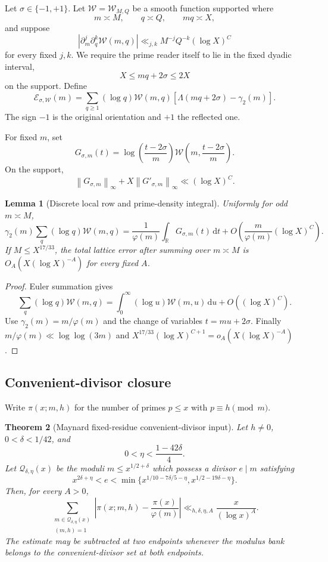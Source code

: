 \documentclass[11pt]{article}
\newtheorem{theorem}{Theorem}[section]
\newtheorem{lemma}[theorem]{Lemma}
\theoremstyle{definition}
\theoremstyle{remark}
\newcommand{\R}{\mathbb R}
\newcommand{\dd}{\mathrm d}
\newcommand{\norm}[1]{\left\lVert#1\right\rVert}
\begin{document}
Let $\sigma\in\{-1,+1\}$.  Let
$\mathscr W=\mathscr W_{M,Q}$ be a smooth function supported where
\[
 m\asymp M,
 \qquad q\asymp Q,
 \qquad mq\asymp X,
\]
and suppose
\[
 |\partial_m^j\partial_q^k\mathscr W(m,q)|
 \ll_{j,k}M^{-j}Q^{-k}(\log X)^C
 \tag{M.9}
\]
for every fixed $j,k$.  We require the prime reader itself to lie in the
fixed dyadic interval,
\[
 X\le mq+2\sigma\le2X
\]
on the support.  Define
\[
 \boxed{
 \mathcal E_{\sigma,\mathscr W}(m)
 =\sum_{q\ge1}(\log q)\mathscr W(m,q)
  [\Lambda(mq+2\sigma)-\gamma_2(m)].}
 \tag{M.10}
\]
The sign $-1$ is the original orientation and $+1$ the reflected one.

For fixed $m$, set
\[
 G_{\sigma,m}(t)
 =\log\!\left(\frac{t-2\sigma}{m}\right)
  \mathscr W\!\left(m,\frac{t-2\sigma}{m}\right).
 \tag{M.11}
\]
On the support,
\[
 \norm{G_{\sigma,m}}_\infty
 +X\norm{G'_{\sigma,m}}_\infty
 \ll(\log X)^C.
 \tag{M.12}
\]

\begin{lemma}[Discrete local row and prime-density integral]
\label{lem:hard-local-integral}
Uniformly for odd $m\asymp M$,
\[
 \boxed{
 \gamma_2(m)\sum_q(\log q)\mathscr W(m,q)
 =\frac1{\varphi(m)}\int_\R G_{\sigma,m}(t)\,\dd t
 +O\!\left(\frac{m}{\varphi(m)}(\log X)^C\right).}
 \tag{M.13}
\]
If $M\le X^{17/33}$, the total lattice error after summing over
$m\asymp M$ is $O_A(X(\log X)^{-A})$ for every fixed $A$.
\end{lemma}

\begin{proof}
Euler summation gives
\[
 \sum_q(\log q)\mathscr W(m,q)
 =\int_0^\infty(\log u)\mathscr W(m,u)\,\dd u
  +O((\log X)^C).
\]
Use $\gamma_2(m)=m/\varphi(m)$ and the change of variables
$t=mu+2\sigma$.  Finally $m/\varphi(m)\ll\log\log(3m)$ and
$X^{17/33}(\log X)^{C+1}=o_A(X(\log X)^{-A})$.
\end{proof}

\subsection{Convenient-divisor closure}

Write $\pi(x;m,h)$ for the number of primes $p\le x$ with
$p\equiv h\pmod m$.

\begin{theorem}[Maynard fixed-residue convenient-divisor input]
\label{thm:hard-Maynard-input}
Let $h\ne0$, $0<\delta<1/42$, and
\[
 0<\eta<\frac{1-42\delta}{4}.
\]
Let $\mathscr Q_{\delta,\eta}(x)$ be the moduli $m\le x^{1/2+\delta}$
which possess a divisor $e\mid m$ satisfying
\[
 x^{2\delta+\eta}<e<
 \min\{x^{1/10-7\delta/5-\eta},
       x^{1/2-19\delta-\eta}\}.
 \tag{M.14}
\]
Then, for every $A>0$,
\[
 \boxed{
 \sum_{\substack{m\in\mathscr Q_{\delta,\eta}(x)\\(m,h)=1}}
 \left|\pi(x;m,h)-\frac{\pi(x)}{\varphi(m)}\right|
 \ll_{h,\delta,\eta,A}\frac{x}{(\log x)^A}.}
 \tag{M.15}
\]
The estimate may be subtracted at two endpoints whenever the modulus bank
belongs to the convenient-divisor set at both endpoints.
\end{theorem}
\end{document}
